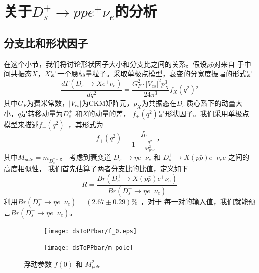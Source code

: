 ﻿%
%
%
\chapter{关于$D_{s}^{+} \to p \bar{p} e^{+} \nu_{e}$的分析}
\section{分支比和形状因子}
在这个小节，我们将讨论形状因子大小和分支比之间的关系。假设$p\bar{p}$对来自
于中间共振态$X$，$X$是一个赝标量粒子。采取单极点模型，衰变的分宽度振幅的形式是
\begin{equation}
    \frac{d \Gamma (D_{s}^{+} \rightarrow X e^{+} \nu _{e} )}{d q^{2}}
    = \frac{G^{2}_{F} \cdot | V_{cs} |^{2} p_{X} ^{3} }{24 \pi ^{3}} f
    _{X} (q^{2}){}^{2}
\end{equation}
其中$G_{F}$为费米常数，$|V_{cs}|$为CKM矩阵元，$p_{X}$为共振态在$D_{s}^{+}$质心系下的动量大小，$q$是转移动量为$D_{s}^{+}$
和$X$的动量的差，
$f_{+}(q^{2})$是形状因子。我们采用单极点模型来描述$f_{+}(q^{2})$~\cite{Bauer:1988fx}，其形式为
\begin{equation}
    f_{+}(q^{2}) = \frac{f_{0}}{1-\frac{q^{2}}{M_{pole}^{2}}}，
\end{equation}
其中$M_{pole} = m_{D_{s}^{*+}}$。
考虑到衰变道 $D_{s}^{+} \to \eta e^{+} \nu_{e}$ 和
$ D_{s}^{+} \to X(p\bar{p}) e^{+} \nu_e{e}$ 之间的高度相似性，
我们首先估算了两者分支比的比值，定义如下
\begin{equation}
   R =  \frac{Br(D_{s}^{+} \rightarrow X(p\bar{p}) e^{+} \nu_{e})}
    {Br(D_{s}^{+} \to \eta e^{+} \nu_{e}) } 
\end{equation}
利用$Br(D_{s}^{+} \to \eta e^{+} \nu_{e}) = (2.67 \pm 0.29) \%$~\cite{PDG}，对于
每一对的输入值，我们就能预言$Br(D_{s}^{+} \to \eta e^{+} \nu_{e})$。
\begin{figure}[htbp]
    \centering
    \begin{subfigure}[]{0.45\textwidth}
        \begin{center}
            \texttt{[image: dsToPPbar/f\_0.eps]}
        \end{center}
        \caption{}%
        \label{fig:}
    \end{subfigure}
    \begin{subfigure}[]{0.45\textwidth}
        \begin{center}
       \texttt{[image: dsToPPbar/m\_pole]}
        \end{center}
        \caption{}%
        \label{fig:}
    \end{subfigure}
    
    \caption{浮动参数 $f(0)$ 和 $M_{pole}^{2}$}%
    \label{fig:float_parameter}
\end{figure}

